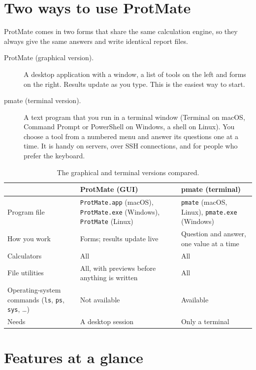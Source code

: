 \documentclass[11pt,a4paper,oneside]{report}
\newcommand{\cmd}[1]{\texttt{#1}}            %
\begin{document}
\section{Two ways to use ProtMate}

ProtMate comes in two forms that share the same calculation engine, so they always give the same
answers and write identical report files.

\begin{description}
  \item[ProtMate (graphical version).] A desktop application with a window, a list of tools on the
    left and forms on the right. Results update as you type. This is the easiest way to start.
  \item[pmate (terminal version).] A text program that you run in a terminal window
    (Terminal on macOS, Command Prompt or PowerShell on Windows, a shell on Linux). You choose a tool
    from a numbered menu and answer its questions one at a time. It is handy on servers, over
    SSH connections, and for people who prefer the keyboard.
\end{description}

\begin{table}[htbp]\centering\small
\caption{The graphical and terminal versions compared.}
\begin{tabularx}{\linewidth}{@{}lXX@{}}
\toprule
 & \textbf{ProtMate (GUI)} & \textbf{pmate (terminal)} \\ \midrule
Program file & \cmd{ProtMate.app} (macOS), \cmd{ProtMate.exe} (Windows), \cmd{ProtMate} (Linux)
             & \cmd{pmate} (macOS, Linux), \cmd{pmate.exe} (Windows) \\
How you work & Forms; results update live & Question and answer, one value at a time \\
Calculators & All & All \\
File utilities & All, with previews before anything is written & All \\
Operating-system commands (\cmd{ls}, \cmd{ps}, \cmd{sys}, \ldots) & Not available & Available \\
Needs & A desktop session & Only a terminal \\
\bottomrule
\end{tabularx}
\end{table}

\section{Features at a glance}
\end{document}

